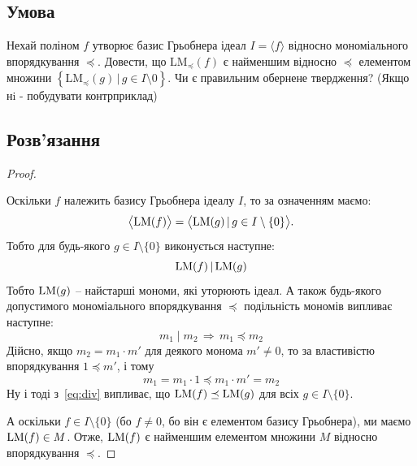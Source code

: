 \chapter{}
\label{chap:3}

\section{Умова}

Нехай поліном $f$ утворює базис Грьобнера ідеал $I = \langle f \rangle$ відносно мономіального впорядкування
$\preceq$. Довести, що $\text{LM}_{\preceq}(f)$ є найменшим відносно $\preceq$ елементом множини
$\left\{\text{LM}_{\preceq}(g) \, \vert \, g \in I \setminus {0}\right\}$. Чи є правильним обернене твердження?
(Якщо нi - побудувати контрприклад)

\section{Розв'язання}

\begin{proof}
    ~\par \noindent Оскільки $f$ належить базису Грьобнера ідеалу $I$, то за означенням маємо:
    \begin{equation*}
        \bigl\langle \mathrm{LM}(f) \bigr\rangle = \bigl\langle \mathrm{LM}(g) \, \vert \, g \in I \setminus \{0\} \bigr\rangle.
    \end{equation*}
    Тобто для будь-якого $g \in I \setminus \{0\}$ виконується наступне:
    \begin{equation}
        \label{eq:div}
        \mathrm{LM}(f) \, \vert \, \mathrm{LM}(g)
    \end{equation}
    Тобто $\mathrm{LM}(g)$ -- найстарші мономи, які уторюють ідеал. А також будь-якого допустимого мономіального впорядкування 
    $\preceq$ подільність мономів випливає наступне:
    \begin{equation*}
        m_1 \mid m_2 \, \Longrightarrow \, m_1 \preceq m_2
    \end{equation*}
    Дійсно, якщо $m_2 = m_1 \cdot m'$ для деякого монома $m' \neq 0$, то за властивістю впорядкування $1 \preceq m'$, 
    і тому
    \begin{equation*}
        m_1 = m_1 \cdot 1 \preceq m_1 \cdot m' = m_2
    \end{equation*}
    Ну і тоді з~\eqref{eq:div} випливає, що $\mathrm{LM}(f) \preceq \mathrm{LM}(g)$ для всіх $g \in I \setminus \{0\}$.

    А оскільки $f \in I \setminus \{0\}$ (бо $f \neq 0$, бо він є елементом базису Грьобнера), ми маємо
    $\mathrm{LM}(f) \in M$. Отже, $\mathrm{LM}(f)$ є найменшим елементом множини $M$ відносно впорядкування $\preceq$.
\end{proof}

